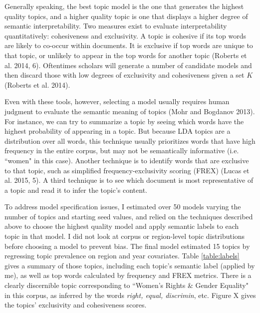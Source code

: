 \documentclass[11pt, oneside]{article}
\begin{document}
Generally speaking, the best topic model is the one that generates the highest quality topics, and a higher quality topic is one that displays a higher degree of semantic interpretability. Two measures exist to evaluate interpretability quantitatively: cohesiveness and exclusivity. A topic is cohesive if its top words are likely to co-occur within documents. It is exclusive if top words are unique to that topic, or unlikely to appear in the top words for another topic (Roberts et al. 2014, 6). Oftentimes scholars will generate a number of candidate models and then discard those with low degrees of exclusivity and cohesiveness given a set $K$ (Roberts et al. 2014).

Even with these tools, however, selecting a model usually requires human judgment to evaluate the semantic meaning of topics (Mohr and Bogdanov 2013). For instance, we can try to summarize a topic by seeing which words have the highest probability of appearing in a topic. But because LDA topics are a distribution over all words, this technique usually prioritizes words that have high frequency in the entire corpus, but may not be semantically informative (i.e. ``women" in this case). Another technique is to identify words that are exclusive to that topic, such as simplified frequency-exclusivity scoring (FREX) (Lucas et al. 2015, 5). A third technique is to see which document is most representative of a topic and read it to infer the topic's content.

To address model specification issues, I estimated over 50 models varying the number of topics and starting seed values, and relied on the techniques described above to choose the highest quality model and apply semantic labels to each topic in that model. I did not look at corpus or region-level topic distributions before choosing a model to prevent bias. The final model estimated 15 topics by regressing topic prevalence on region and year covariates. Table \ref{table:labels} gives a summary of those topics, including each topic's semantic label (applied by me), as well as top words calculated by frequency and FREX metrics. There is a clearly discernible topic corresponding to ``Women's Rights \& Gender Equality" in this corpus, as inferred by the words \emph{right, equal, discrimin}, etc. Figure X gives the topics' exclusivity and cohesiveness scores.
\end{document}

